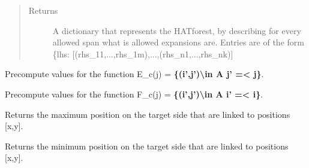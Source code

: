 \documentclass[letterpaper,10pt,english]{sphinxmanual}
\begin{document}
\begin{fulllineitems}
\begin{fulllineitems}
\begin{quote}
\begin{description}
\item[{Returns}] \leavevmode
A dictionary that represents the HATforest, by describing for
every allowed span what is allowed expansions are. Entries are of
the form \{lhs: {[}(rhs\_11,...,rhs\_1m),...,(rhs\_n1,...,rhs\_nk){]}

\end{description}\end{quote}

\end{fulllineitems}


\begin{fulllineitems}
\label{alignments:alignments.Alignments._links_fromE}
Precompute values for the function
E\_c(j) = {\color{red}\bfseries{}\textbar{}\{(i',j')\textbackslash{}in A \textbar{} j' =\textless{} j\}\textbar{}}.

\end{fulllineitems}


\begin{fulllineitems}
\label{alignments:alignments.Alignments._links_fromF}
Precompute values for the function
F\_c(j) = {\color{red}\bfseries{}\textbar{}\{(i',j')\textbackslash{}in A \textbar{} i' =\textless{} i\}\textbar{}}.

\end{fulllineitems}


\begin{fulllineitems}
\label{alignments:alignments.Alignments._maxspan}
Returns the maximum position on the target side
that are linked to positions {[}x,y{]}.

\end{fulllineitems}


\begin{fulllineitems}
\label{alignments:alignments.Alignments._minspan}
Returns the minimum position on the target side
that are linked to positions {[}x,y{]}.


\end{fulllineitems}
\end{fulllineitems}
\end{document}
